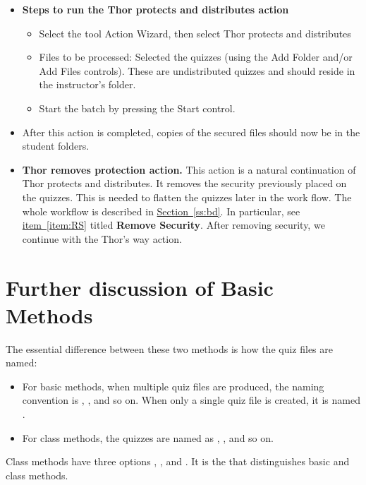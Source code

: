 \documentclass{article}
\begin{document}
\begin{itemize}
\goodbreak
      \item[]\textbf{Steps to run the \textsf{Thor protects and distributes} action}
      \begin{itemize}
        \item Select the tool \textsf{Action Wizard}, then select
            \textsf{Thor protects and distributes}
        \item\textsf{Files to be processed:} Selected the quizzes
            (using the \textsf{Add Folder} and/or \textsf{Add Files}
            controls). These are undistributed quizzes and should
            reside in the instructor's folder.
        \item Start the batch by pressing the \textsf{Start} control.
      \end{itemize}
      \item[] After this action is completed, copies of the secured files should
        now be in the student folders.
  \item \textbf{\textsf{Thor removes protection} action.} This action is a
      natural continuation of \textsf{Thor protects and distributes}. It
      removes the security previously placed on the quizzes. This is needed
      to flatten the quizzes later in the work flow. The whole workflow is
      described in \hyperref[ss:bd]{Section~\ref{ss:bd}}. In particular,
      see \hyperref[item:RS]{item~\ref*{item:RS}} titled \textbf{Remove Security}.
      After removing security, we continue with the \textsf{Thor's way} action.
\end{itemize}

\section{Further discussion of Basic Methods}

The essential difference between these two methods is how the quiz files are
named:
\begin{itemize}
  \item For basic methods, when multiple quiz files are produced, the
      naming convention is , , and so
      on. When only a single quiz file is created, it is named
      .
  \item For class methods, the quizzes are named as
      ,
      , and so on.
\end{itemize}
Class methods have three options , , and .
It is the  that distinguishes basic and class methods.
\end{document}
